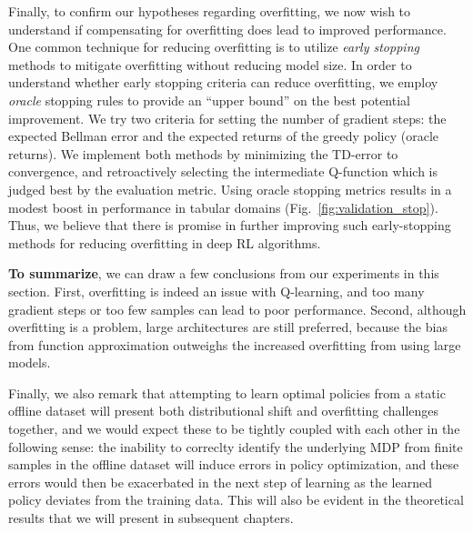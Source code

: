 Finally, to confirm our hypotheses regarding overfitting, we now wish to understand if compensating for overfitting does lead to improved performance. One common technique for reducing overfitting is to utilize \textit{early stopping} methods to mitigate overfitting without reducing model size.
In order to understand whether early stopping criteria can reduce overfitting, we employ \emph{oracle} stopping rules to provide an ``upper bound'' on the best potential improvement. We try two criteria for setting the number of gradient steps: the expected Bellman error and the expected returns of the greedy policy (oracle returns). We implement both methods by minimizing the TD-error to convergence, and retroactively selecting the intermediate Q-function which is judged best by the evaluation metric. Using oracle stopping metrics results in a modest boost in performance in tabular domains (Fig.~\ref{fig:validation_stop}). Thus, we believe that there is promise in further improving such early-stopping methods for reducing overfitting in deep RL algorithms.

\textbf{To summarize}, we can draw a few conclusions from our experiments in this section. First, overfitting is indeed an issue with Q-learning, and too many gradient steps or too few samples can lead to poor performance. Second, although overfitting is a problem, large architectures are still preferred, because the bias from function approximation outweighs the increased overfitting from using large models. 

Finally, we also remark that attempting to learn optimal policies from a static offline dataset will present both distributional shift and overfitting challenges together, and we would expect these to be tightly coupled with each other in the following sense: the inability to correclty identify the underlying MDP from finite samples in the offline dataset will induce errors in policy optimization, and these errors would then be exacerbated in the next step of learning as the learned policy deviates from the training data. This will also be evident in the theoretical results that we will present in subsequent chapters.    